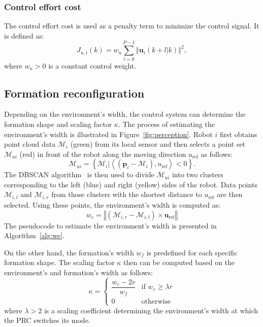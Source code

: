 \subsubsection{Control effort cost}
The control effort cost is used as a penalty term to minimize the control signal. It is defined as:
\begin{equation}
    J_{u,i}(k)=w_u\sum_{l=0}^{P-1}\left\Vert \mathbf{u}_i(k+l|k)\right\Vert^2,
\end{equation}
where $w_u>0$ is a constant control weight.

\subsection{Formation reconfiguration}\label{sec:obs_aware}

Depending on the environment's width, the control system can determine the formation shape and scaling factor $\kappa$. The process of estimating the environment's width is illustrated in Figure~\ref{fig:perception}. Robot $i$ first obtains point cloud data $\mathcal{M}_i$ (green) from its local sensor and then selects a point set $\mathcal{M}_{ui}$ (red) in front of the robot along the moving direction $u_\text{ref}$ as follows:
\begin{equation}
    \mathcal{M}_{ui} = \left\{\mathcal{M}_{i}\vert\left\langle\left(\mathbf{p}_i-\mathcal{M}_{i}\right),u_\text{ref}\right\rangle<0\right\}.
    \label{eqn:mui}
\end{equation}
The DBSCAN algorithm~\cite{10.5555/3001460.3001507} is then used to divide $\mathcal{M}_{ui}$ into two clusters corresponding to the left (blue) and right (yellow) sides of the robot. Data points $\mathcal{M}_{i,l}$ and $\mathcal{M}_{i,r}$ from those clusters with the shortest distance to $u_\text{ref}$ are then selected. Using these points, the environment's width is computed as:
\begin{equation}
    w_e= \left\Vert\left(\mathcal{M}_{i,r}-\mathcal{M}_{i,l}\right)\times \mathbf{u}_\text{ref}\right\Vert
    \label{eqn:we}
\end{equation}
The pseudocode to estimate the environment's width is presented in Algorithm~\ref{alg:we}. 

On the other hand, the formation's width $w_f$ is predefined for each specific formation shape. The scaling factor $\kappa$ then can be computed based on the environment's and formation's width as follows:
\begin{equation}
    \kappa = 
    \begin{cases} 
        \dfrac{w_e - 2r}{w_f} & \text{if } w_e \geq \lambda r \\
        0 & \text{otherwise}
    \end{cases}
    \label{eqn:kappa}
\end{equation}
where $\lambda > 2$ is a scaling coefficient determining the environment's width at which the PRC switches its mode. 

